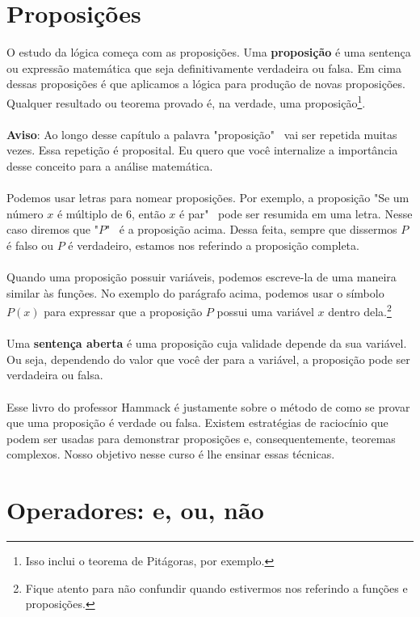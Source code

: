 \documentclass[a4paper,11pt]{book}
\theoremstyle{definition}
\theoremstyle{break}
\begin{document}
\section{Proposições}

O estudo da lógica começa com as proposições. Uma \textbf{proposição} é uma sentença ou expressão matemática que seja definitivamente verdadeira ou falsa. Em cima dessas proposições é que aplicamos a lógica para produção de novas proposições. Qualquer resultado ou teorema provado é, na verdade, uma proposição\footnote{Isso inclui o teorema de Pitágoras, por exemplo.}. 
\\
\\
\textbf{Aviso}: Ao longo desse capítulo a palavra "proposição" \ vai ser repetida muitas vezes. Essa repetição é proposital. Eu quero que você internalize a importância desse conceito para a análise matemática.
\\
\\
Podemos usar letras para nomear proposições. Por exemplo, a proposição "Se um número $x$ é múltiplo de 6, então $x$ é par" \  pode ser resumida em uma letra. Nesse caso diremos que "$P$" \ é a proposição acima. Dessa feita, sempre que dissermos $P$ é falso ou $P$ é verdadeiro, estamos nos referindo a proposição completa.
\\
\\
Quando uma proposição possuir variáveis, podemos escreve-la de uma maneira similar às funções. No exemplo do parágrafo acima, podemos usar o símbolo $P(x)$ para expressar que a proposição $P$ possui uma variável $x$ dentro dela.\footnote{Fique atento para não confundir quando estivermos nos referindo a funções e proposições.}
\\
\\
Uma \textbf{sentença aberta} é uma proposição cuja validade depende da sua variável. Ou seja, dependendo do valor que você der para a variável, a proposição pode ser verdadeira ou falsa.
\\
\\
Esse livro do professor Hammack é justamente sobre o método de como se provar que uma proposição é verdade ou falsa. Existem estratégias de raciocínio que podem ser usadas para demonstrar proposições e, consequentemente, teoremas complexos. Nosso objetivo nesse curso é lhe ensinar essas técnicas.

\section{Operadores: e, ou, não}
\end{document}

